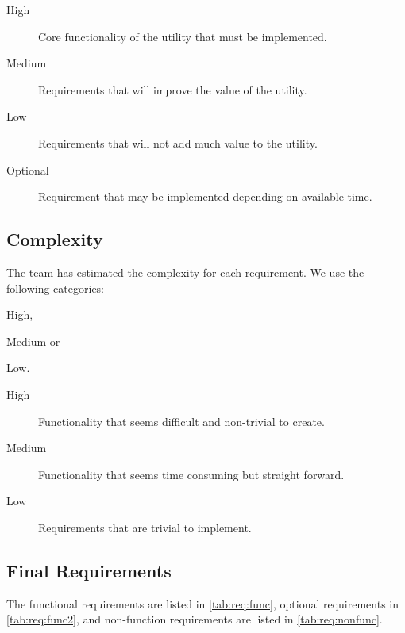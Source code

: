 \begin{description}
	\item[High] Core functionality of the \gls{utility} that must be implemented.
	\item[Medium] Requirements that will improve the value of the \gls{utility}.
	\item[Low] Requirements that will not add much value to the \gls{utility}.
	\item[Optional] Requirement that may be implemented depending on available time.
\end{description}

\subsection{Complexity}
\label{sec:req:compl}
The team has estimated the complexity for each requirement. We use the following categories:
\begin{inparaenum}
	\item High,
	\item Medium or
	\item Low.
\end{inparaenum}

\begin{description}
	\item[High] Functionality that seems difficult and non-trivial to create.
	\item[Medium] Functionality that seems time consuming but straight forward.
	\item[Low] Requirements that are trivial to implement.
\end{description}

\subsection{Final Requirements}
\label{sec:req:finalreq}
The functional requirements are listed in \autoref{tab:req:func}, optional
requirements in \autoref{tab:req:func2}, and non-function requirements are
listed in \autoref{tab:req:nonfunc}.

